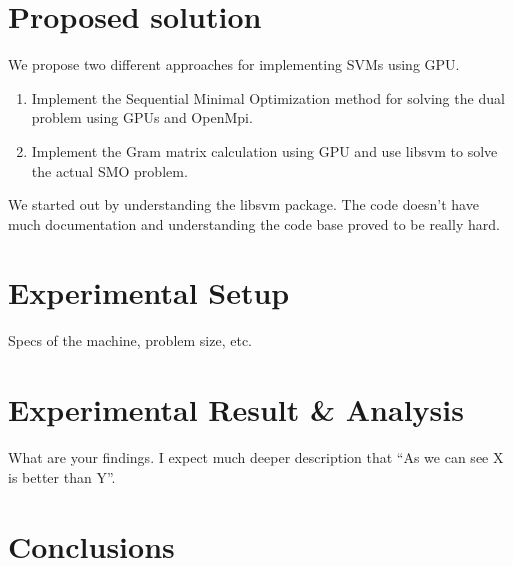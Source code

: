 \documentclass{article}
\begin{document}
\section{Proposed solution}
We propose two different approaches for implementing SVMs using GPU\@.

\begin{enumerate}
\item Implement the Sequential Minimal Optimization method for solving the dual problem using GPUs and OpenMpi.
\item Implement the Gram matrix calculation using GPU and use libsvm to solve the actual SMO problem.
\end{enumerate}

We started out by understanding the libsvm package.  
The code doesn't have much documentation and understanding the code base proved to be really hard.

\section{Experimental Setup}
Specs of the machine, problem size, etc.
\section{Experimental Result \& Analysis}
What are your findings. I expect much deeper description that ``As we can see X is better than Y''.

\section{Conclusions}




\end{document}
